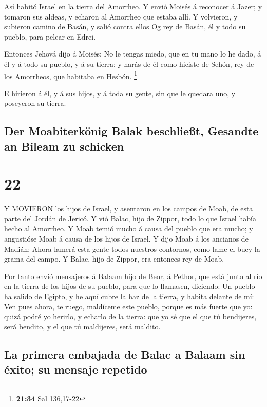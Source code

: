  Así habitó Israel en la tierra del Amorrheo. 
Y envió Moisés á reconocer á Jazer; y tomaron sus aldeas, y echaron al
Amorrheo que estaba allí.  Y volvieron, y subieron camino
de Basán, y salió contra ellos Og rey de Basán, él y todo su pueblo,
para pelear en Edrei.

 Entonces Jehová dijo á Moisés: No le tengas miedo, que en
tu mano lo he dado, á él y á todo su pueblo, y á su tierra; y harás de
él como hiciste de Sehón, rey de los Amorrheos, que habitaba en Hesbón.
\footnote{\textbf{21:34} Sal 136,17-22}

 E hirieron á él, y á sus hijos, y á toda su gente, sin que
le quedara uno, y poseyeron su tierra.

\hypertarget{der-moabiterkuxf6nig-balak-beschlieuxdft-gesandte-an-bileam-zu-schicken}{%
\subsection{Der Moabiterkönig Balak beschließt, Gesandte an Bileam zu
schicken}\label{der-moabiterkuxf6nig-balak-beschlieuxdft-gesandte-an-bileam-zu-schicken}}

\hypertarget{section-21}{%
\section{22}\label{section-21}}

 Y MOVIERON los hijos de Israel, y asentaron en los campos
de Moab, de esta parte del Jordán de Jericó.  Y vió Balac,
hijo de Zippor, todo lo que Israel había hecho al Amorrheo. 
Y Moab temió mucho á causa del pueblo que era mucho; y angustióse Moab á
causa de los hijos de Israel.  Y dijo Moab á los ancianos de
Madián: Ahora lamerá esta gente todos nuestros contornos, como lame el
buey la grama del campo. Y Balac, hijo de Zippor, era entonces rey de
Moab.

 Por tanto envió mensajeros á Balaam hijo de Beor, á Pethor,
que está junto al río en la tierra de los hijos de su pueblo, para que
lo llamasen, diciendo: Un pueblo ha salido de Egipto, y he aquí cubre la
haz de la tierra, y habita delante de mí:  Ven pues ahora,
te ruego, maldíceme este pueblo, porque es más fuerte que yo: quizá
podré yo herirlo, y echarlo de la tierra: que yo sé que el que tú
bendijeres, será bendito, y el que tú maldijeres, será maldito.

\hypertarget{la-primera-embajada-de-balac-a-balaam-sin-uxe9xito-su-mensaje-repetido}{%
\subsection{La primera embajada de Balac a Balaam sin éxito; su mensaje
repetido}\label{la-primera-embajada-de-balac-a-balaam-sin-uxe9xito-su-mensaje-repetido}}

